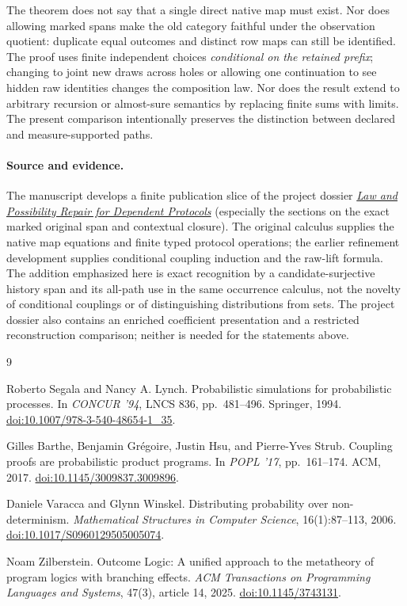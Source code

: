 \documentclass[11pt]{article}
\theoremstyle{definition}
\begin{document}
The theorem does not say that a single direct native map must exist.
Nor does allowing marked spans make the old category faithful under
the observation quotient: duplicate equal outcomes and distinct row
maps can still be identified. The proof uses finite independent
choices \emph{conditional on the retained prefix}; changing to joint
new draws across holes or allowing one continuation to see hidden
raw identities changes the composition law. Nor does the result
extend to arbitrary recursion or almost-sure semantics by replacing
finite sums with limits. The present comparison intentionally
preserves the distinction between declared and measure-supported paths.

\paragraph{Source and evidence.}
The manuscript develops a finite publication slice of the project
dossier \href{https://github.com/eternal-november/eos-research-programmes/blob/f458186590df968a516ba73a8eb76fcf044544b0/projects/contextual-composition/protocols/law-and-possibility/Law_and_Possibility_Repair_for_Dependent_Protocols.tex}{\emph{Law and Possibility Repair for Dependent Protocols}}
(especially the sections on the exact marked original span and
contextual closure). The original calculus supplies the native map
equations and finite typed protocol operations; the earlier
refinement development supplies conditional coupling induction and the
raw-lift formula. The addition emphasized here is exact recognition
by a candidate-surjective history span and its all-path use in the
same occurrence calculus, not the novelty of conditional couplings or
of distinguishing distributions from sets. The project dossier also
contains an enriched coefficient presentation and a restricted
reconstruction comparison; neither is needed for the statements above.
\begin{thebibliography}{9}
  \raggedright
{}
Roberto Segala and Nancy A. Lynch.
Probabilistic simulations for probabilistic processes.
In \emph{CONCUR '94}, LNCS 836, pp.~481--496. Springer, 1994.
\href{https://doi.org/10.1007/978-3-540-48654-1_35}{doi:10.1007/978-3-540-48654-1\_35}.

Gilles Barthe, Benjamin Gr\'egoire, Justin Hsu, and Pierre-Yves Strub.
Coupling proofs are probabilistic product programs.
In \emph{POPL '17}, pp.~161--174. ACM, 2017.
\href{https://doi.org/10.1145/3009837.3009896}{doi:10.1145/3009837.3009896}.

Daniele Varacca and Glynn Winskel.
Distributing probability over non-determinism.
\emph{Mathematical Structures in Computer Science}, 16(1):87--113, 2006.
\href{https://doi.org/10.1017/S0960129505005074}{doi:10.1017/S0960129505005074}.

Noam Zilberstein.
Outcome Logic: A unified approach to the metatheory of program logics with
branching effects.
\emph{ACM Transactions on Programming Languages and Systems}, 47(3),
article 14, 2025.
\href{https://doi.org/10.1145/3743131}{doi:10.1145/3743131}.
\end{thebibliography}
\end{document}
